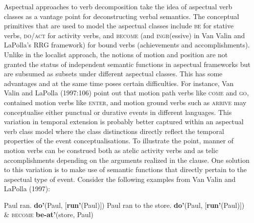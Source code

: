 Aspectual approaches to verb decomposition take the idea of aspectual verb classes as a vantage point for deconstructing verbal semantics. The conceptual primitives that are used to model the aspectual classes include \textsc{be} for stative verbs, \textsc{do/act} for activity verbs, and \textsc{become} (and \textsc{ingr}(essive) in Van Valin and LaPolla's RRG framework) for bound verbs (achievements and accomplishments). Unlike in the localist approach, the notions of motion and position are not granted the status of independent semantic functions in aspectual frameworks but are subsumed as subsets under different aspectual classes. This has some advantages and at the same time poses certain difficulties. For instance, Van Valin and LaPolla (1997:106) point out that motion path verbs like \textsc{come} and \textsc{go}, contained motion verbs like \textsc{enter}, and motion ground verbs such as \textsc{arrive} may conceptualise either punctual or durative events in different languages. This variation in temporal extension is probably better captured within an aspectual verb class model where the class distinctions directly reflect the temporal properties of the event conceptualisations. To illustrate the point, manner of motion verbs can be construed both as atelic activity verbs and as telic accomplishments depending on the arguments realized in the clause. One solution to this variation is to make use of semantic functions that directly pertain to the aspectual type of event. Consider the following examples from Van Valin and LaPolla (1997):

\ea \label{VanValin:run}
\ea Paul ran. \label{VanValin:runa}
 \textbf{do'}(Paul, [\textbf{run'}(Paul)])
\ex Paul ran to the store. \label{VanValin:runb}
 \textbf{do'}(Paul, [\textbf{run'}(Paul)]) \& \textsc{become} \textbf{be-at'}(store, Paul)
\z
\z

